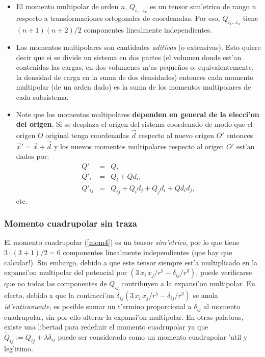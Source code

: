 \begin{itemize} 
\item El momento multipolar de orden $n$, $Q_{i_1\dots i_n}$ es un tensor sim'etrico de rango $n$ respecto a transformaciones ortogonales de coordenadas. Por eso, $Q_{i_1\dots i_n}$ tiene $(n+1)(n+2)/2$ componentes linealmente independientes.

\item Los momentos multipolares son cantidades \textit{aditivas} (o extensivas). Esto quiere decir que si se divide un sistema en dos partes (el volumen donde est'an contenidas las cargas, en dos volumenes m'as peque\~nos o, equivalentemente, la densidad de carga en la suma de dos densidades) entonces cada momento multipolar (de un orden dado) es la suma de los momentos multipolares de cada subsistema.

\item Note que los momentos multipolares \textbf{dependen en general de la
elecci'on del origen}. Si se desplaza el origen del sistema coordenado de modo que el origen $O$ original tenga coordenadas $\vec{d}$ respecto al nuevo origen $O'$ entonces
$\vec{x}'=\vec{x}+\vec{d}$ y los nuevos momentos multipolares respecto al origen $O'$ est'an dados por:
\begin{eqnarray}
 Q'&=&Q,\\
Q'_i&=&Q_i+Qd_i,\\
Q'_{ij}&=&Q_{ij}+Q_id_j+Q_jd_i+Qd_id_j,
\end{eqnarray}
etc.
\end{itemize}

\subsubsection{Momento cuadrupolar sin traza}\label{MCSM}
El momento cuadrupolar (\ref{mom4}) es un tensor \textit{sim'etrico}, por lo
que tiene ${3\cdot (3+1)}/{2}=6$ componentes linealmente independientes (que
hay que calcular!). Sin embargo, debido a que este tensor siempre est'a
multiplicado en la expansi'on multipolar del potencial por
$\left({3\,x_i\,x_j}/{r^5}-{\delta_{ij}}/{r^3}\right)$, puede
verificarse que no todas las componentes de $Q_{ij}$ contribuyen a la
expansi'on multipolar. En efecto, debido a que la contracci'on
$\delta_{ij}\left({3\,x_i\,x_j}/{r^5}-{\delta_{ij}}/{r^3}\right)$ se
anula \textit{id'enticamente}, es posible sumar un t'ermino proporcional a
$\delta_{ij}$ al momento cuadrupolar, sin por ello alterar la expansi'on
multipolar. En otras palabras, existe una libertad para redefinir el momento
cuadrupolar ya que $\tilde{Q}_{ij}:=Q_{ij}+\lambda\delta_{ij}$ puede ser
considerado como un momento cuadrupolar 'util y leg'itimo. 


